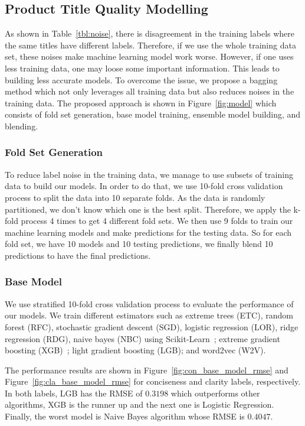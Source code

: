 \documentclass[sigconf]{acmart}
\begin{document}
\subsection{Product Title Quality Modelling}
As shown in Table~\ref{tbl:noise}, there is disagreement in the training labels where the same titles have different labels. Therefore, if we use the whole training data set, these noises make machine learning model work worse. However, if one uses less training data, one may loose some important information. This leads to building less accurate models. To overcome the issue, we propose a bagging method which not only leverages all training data but also reduces noises in the training data. The proposed approach is shown in Figure~\ref{fig:model} which consists of fold set generation, base model training, ensemble model building, and blending.

\subsubsection{Fold Set Generation}
To reduce label noise in the training data, we manage to use subsets of training data to build our models. In order to do that, we use 10-fold cross validation process to split the data into 10 separate folds. As the data is randomly partitioned, we don't know which one is the best split. Therefore, we apply the k-fold process 4 times to get 4 different fold sets. We then use 9 folds to train our machine learning models and make predictions for the testing data. So for each fold set, we have 10 models and 10 testing predictions, we finally blend 10 predictions to have the final predictions. 

\subsubsection{Base Model}

We use stratified 10-fold cross validation process to evaluate the performance of our models. We train different estimators such as extreme trees (ETC), random forest (RFC), stochastic gradient descent (SGD), logistic regression (LOR), ridge regression (RDG), naive bayes (NBC) using Scikit-Learn~\cite{scikit-learn}; extreme gradient boosting (XGB)~\cite{DBLP:conf/kdd/ChenG16}; light gradient boosting (LGB); and word2vec (W2V). 

The performance results are shown in Figure~\ref{fig:con_base_model_rmse} and Figure~\ref{fig:cla_base_model_rmse} for conciseness and clarity labels, respectively. In both labels, LGB has the RMSE of $0.3198$ which outperforms other algorithms, XGB is the runner up and the next one is Logistic Regression. Finally, the worst model is Naive Bayes algorithm whose RMSE is $0.4047$. 
\end{document}

